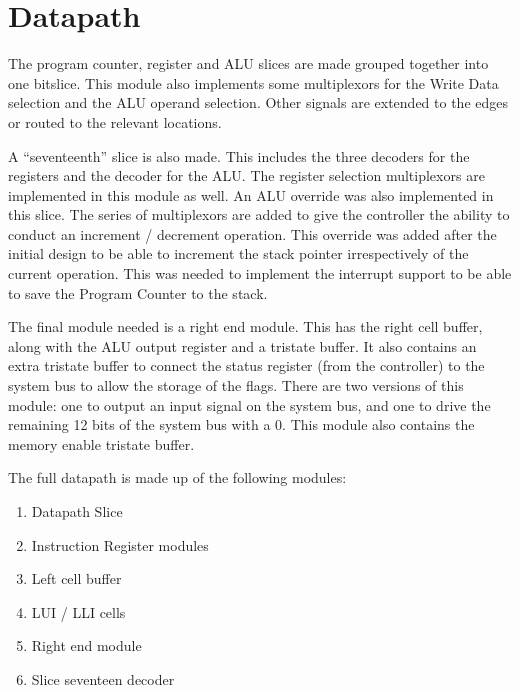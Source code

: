 

\section{Datapath}



The program counter, register and ALU slices are made grouped together into one bitslice.
This module also implements some multiplexors for the Write Data selection and the ALU operand selection.
Other signals are extended to the edges or routed to the relevant locations. 

A ``seventeenth'' slice is also made. 
This includes the three decoders for the registers and the decoder for the ALU.
The register selection multiplexors are implemented in this module as well.
An ALU override was also implemented in this slice.
The series of multiplexors are added to give the controller the ability to conduct an increment / decrement operation. 
This override was added after the initial design to be able to increment the stack pointer irrespectively of the current operation.
This was needed to implement the interrupt support to be able to save the Program Counter to the stack.

The final module needed is a right end module.
This has the right cell buffer, along with the ALU output register and a tristate buffer.
It also contains an extra tristate buffer to connect the status register (from the controller) to the system bus to allow the storage of the flags.
There are two versions of this module: one to output an input signal on the system bus, and one to drive the remaining 12 bits of the system bus with a 0. 
This module also contains the memory enable tristate buffer.


The full datapath is made up of the following modules:
\begin{enumerate}
\item Datapath Slice
\item Instruction Register modules
\item Left cell buffer
\item LUI / LLI cells
\item Right end module
\item Slice seventeen decoder
\end{enumerate}

